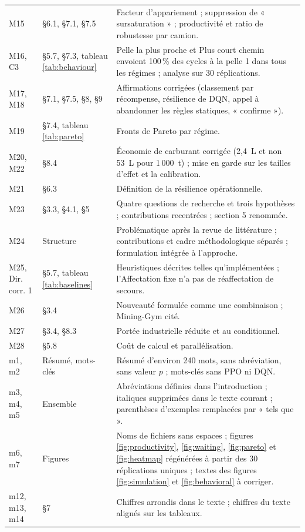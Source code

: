 \documentclass[11pt,a4paper]{article}
\begin{document}
\begin{longtable}{p{2.2cm}p{4.3cm}p{8.6cm}}
M15 & §6.1, §7.1, §7.5 & Facteur d'appariement ; suppression de « sursaturation » ; productivité et ratio de robustesse par camion. \\
M16, C3 & §5.7, §7.3, tableau \ref{tab:behaviour} & Pelle la plus proche et Plus court chemin envoient 100\,\% des cycles à la pelle 1 dans tous les régimes ; analyse sur 30 réplications. \\
M17, M18 & §7.1, §7.5, §8, §9 & Affirmations corrigées (classement par récompense, résilience de DQN, appel à abandonner les règles statiques, « confirme »). \\
M19 & §7.4, tableau \ref{tab:pareto} & Fronts de Pareto par régime. \\
M20, M22 & §8.4 & Économie de carburant corrigée (2,4~L et non 53~L pour 1\,000~t) ; mise en garde sur les tailles d'effet et la calibration. \\
M21 & §6.3 & Définition de la résilience opérationnelle. \\
M23 & §3.3, §4.1, §5 & Quatre questions de recherche et trois hypothèses ; contributions recentrées ; section 5 renommée. \\
M24 & Structure & Problématique après la revue de littérature ; contributions et cadre méthodologique séparés ; formulation intégrée à l'approche. \\
M25, Dir. corr. 1 & §5.7, tableau \ref{tab:baselines} & Heuristiques décrites telles qu'implémentées ; l'Affectation fixe n'a pas de réaffectation de secours. \\
M26 & §3.4 & Nouveauté formulée comme une combinaison ; Mining-Gym cité. \\
M27 & §3.4, §8.3 & Portée industrielle réduite et au conditionnel. \\
M28 & §5.8 & Coût de calcul et parallélisation. \\
m1, m2 & Résumé, mots-clés & Résumé d'environ 240 mots, sans abréviation, sans valeur $p$ ; mots-clés sans PPO ni DQN. \\
m3, m4, m5 & Ensemble & Abréviations définies dans l'introduction ; italiques supprimées dans le texte courant ; parenthèses d'exemples remplacées par « tels que ». \\
m6, m7 & Figures & Noms de fichiers sans espaces ; figures \ref{fig:productivity}, \ref{fig:waiting}, \ref{fig:pareto} et \ref{fig:heatmap} régénérées à partir des 30 réplications uniques ; textes des figures \ref{fig:simulation} et \ref{fig:behavioral} à corriger. \\
m12, m13, m14 & §7 & Chiffres arrondis dans le texte ; chiffres du texte alignés sur les tableaux. \\

\end{longtable}
\end{document}
